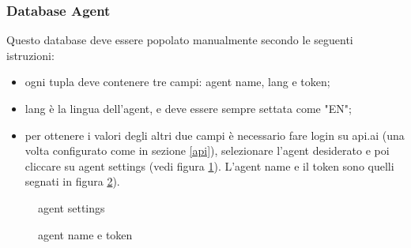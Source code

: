 \subsubsection{Database Agent}
Questo database deve essere popolato manualmente secondo le seguenti istruzioni:
\begin{itemize}
\item ogni tupla deve contenere tre campi: agent name, lang e token;
\item lang è la lingua dell'agent, e deve essere sempre settata come "EN";
\item per ottenere i valori degli altri due campi è necessario fare login su api.ai (una volta configurato come in sezione \ref{api}), selezionare l'agent desiderato e poi cliccare su agent settings (vedi figura \ref{fig:Agent-Settings}). L'agent name e il token sono quelli segnati in figura \ref{fig:Agent-Token}).
\end{itemize}
\begin{figure}[H]
	\caption{agent settings}\label{fig:Agent-Settings}
\end{figure}

\begin{figure}[H]
	\caption{agent name e token}\label{fig:Agent-Token}
\end{figure}

